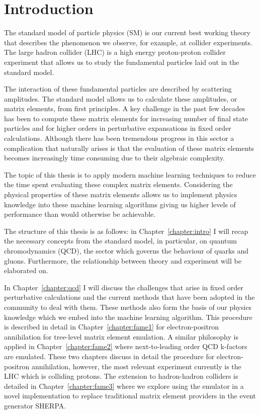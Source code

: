 \documentclass[main.tex]{subfiles}
\begin{document}
\chapter{Introduction}
The standard model of particle physics (SM) is our current best working
theory that describes the phenomenon we observe, for  example,
 at collider experiments.
The large hadron collider (LHC) is a high energy proton-proton
collider experiment that allows us to study the fundamental particles
laid out in the standard model.

The interaction of these fundamental particles are described
by scattering amplitudes. The standard model allows us to
calculate these amplitudes, or matrix elements, from first
principles. A key challenge in the past few decades has been
to compute these matrix elements for increasing number of
final state particles and for higher orders in perturbative
expansations in fixed order calculations. Although there
has been tremendous progress in this sector a complication
that naturally arises is that the evaluation of these matrix
elements becomes increasingly time consuming due to their
algebraic complexity.

The topic of this thesis is to apply modern machine learning
techniques to reduce the time spent evaluating these
complex matrix elements. Considering the physical properties
of these matrix elements allows us to implement physics
knowledge into these machine learning algorithms giving
us higher levels of performance than would otherwise be
achievable.

The structure of this thesis is as follows: in Chapter~\ref{chapter:intro}
I will recap the necessary concepts from the standard
model, in particular, on quantum chromodynamics (QCD), the sector
which governs the behaviour of quarks and gluons. Furthermore,
the relationship between theory and experiment will be elaborated on.

In Chapter~\ref{chapter:qcd} I will discuss the challenges that arise
in fixed order perturbative calculations and the current methods
that have been adopted in the community to deal with them. These
methods also form the basis of our physics knowledge which we
embed into the machine learning algorithm. This procedure is 
described in detail in Chapter~\ref{chapter:fame1} for electron-positron
annihilation for tree-level matrix element emulation.
A similar philosophy is applied in Chapter~\ref{chapter:fame2}
where next-to-leading order QCD k-factors are emulated.
These two chapters discuss in detail the procedure for
electron-positron annihilation, however, the most relevant
experiment currently is the LHC which is colliding protons.
The extension to hadron-hadron colliders is detailed in
Chapter~\ref{chapter:fame3} where we explore using the
emulator in a novel implementation to replace traditional
matrix element providers in the event generator SHERPA.
\end{document}
